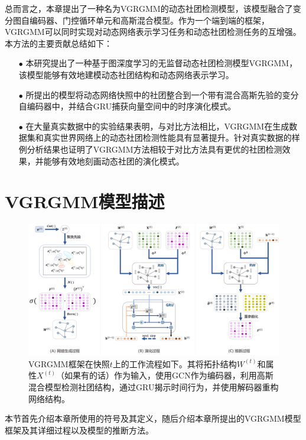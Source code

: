 总而言之，本章提出了一种名为VGRGMM的动态社团检测模型，该模型融合了变分图自编码器、门控循环单元和高斯混合模型。作为一个端到端的框架，VGRGMM可以同时实现对动态网络表示学习任务和动态社团检测任务的互增强。本方法的主要贡献总结如下：
\begin{itemize}
    \item[$\bullet$] 本研究提出了一种基于图深度学习的无监督动态社团检测模型VGRGMM，该模型能够有效地建模动态社团结构和动态网络表示学习。
    \item[$\bullet$] 所提出的模型将动态网络快照中的社团整合到一个带有混合高斯先验的变分自编码器中，并结合GRU捕获向量空间中的时序演化模式。
    \item[$\bullet$] 在大量真实数据中的实验结果表明，与对比方法相比，VGRGMM在生成数据集和真实世界网络上的动态社团检测性能具有显著提升。针对真实数据的样例分析结果也证明了VGRGMM方法相较于对比方法具有更优的社团检测效果，并能够有效地刻画动态社团的演化模式。
\end{itemize}


\section{VGRGMM模型描述\label{chap6:model}}

\begin{figure}
\centering 
\includegraphics[width=\textwidth]{figures/chap06/VGRGMM.png}
\caption{VGRGMM框架在快照$t$上的工作流程如下。其将拓扑结构$W^{(t)}$和属性$X^{(t)}$（如果有的话）作为输入，使用GCN作为编码器，利用高斯混合模型检测社团结构，通过GRU揭示时间行为，并使用解码器重构网络结构。
} 
\label{fig1}
\end{figure}


本节首先介绍本章所使用的符号及其定义，随后介绍本章所提出的VGRGMM模型框架及其详细过程以及模型的推断方法。

